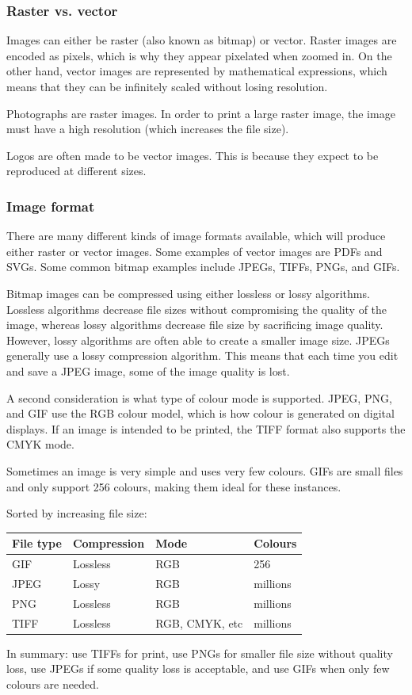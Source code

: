 \documentclass[letterpaper]{article}
\begin{document}
\subsubsection{Raster vs. vector}
Images can either be raster (also known as bitmap) or vector. Raster images are encoded as pixels, which is why they appear pixelated when zoomed in. On the other hand, vector images are represented by mathematical expressions, which means that they can be infinitely scaled without losing resolution. 

Photographs are raster images. In order to print a large raster image, the image must have a high resolution (which increases the file size). 

Logos are often made to be vector images. This is because they expect to be reproduced at different sizes. 

\subsubsection{Image format}
There are many different kinds of image formats available, which will produce either raster or vector images. Some examples of vector images are PDFs and SVGs. Some common bitmap examples include JPEGs, TIFFs, PNGs, and GIFs. 

Bitmap images can be compressed using either lossless or lossy algorithms. Lossless algorithms decrease file sizes without compromising the quality of the image, whereas lossy algorithms decrease file size by sacrificing image quality. However, lossy algorithms are often able to create a smaller image size. JPEGs generally use a lossy compression algorithm. This means that each time you edit and save a JPEG image, some of the image quality is lost. 

A second consideration is what type of colour mode is supported. JPEG, PNG, and GIF use the RGB colour model, which is how colour is generated on digital displays. If an image is intended to be printed, the TIFF format also supports the CMYK mode.

Sometimes an image is very simple and uses very few colours. GIFs are small files and only support 256 colours, making them ideal for these instances.

Sorted by increasing file size:
\begin{center}
\begin{tabular}{l l l l }
\hline
File type & Compression & Mode & Colours \\
\hline
GIF & Lossless & RGB & 256 \\
JPEG &  Lossy & RGB & millions\\
PNG &Lossless & RGB &  millions \\
TIFF & Lossless & RGB, CMYK, etc & millions \\
\end{tabular}
\end{center}
\bigskip
In summary: use TIFFs for print, use PNGs for smaller file size without quality loss, use JPEGs if some quality loss is acceptable, and use GIFs when only few colours are needed.
\end{document}
